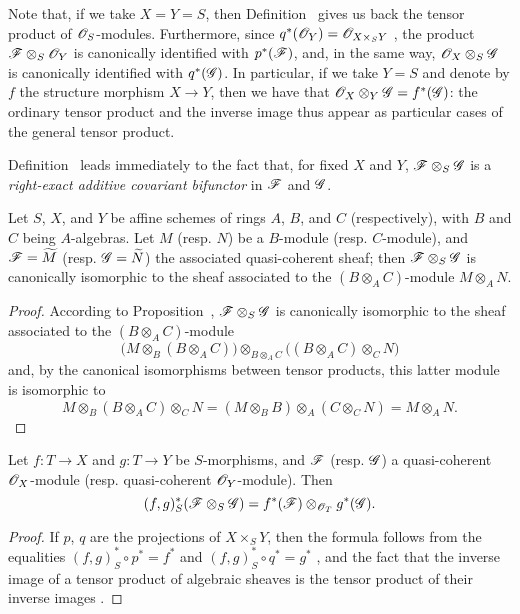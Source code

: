 Note that, if we take $X=Y=S$, then Definition~ gives us back the tensor
product of $\mathscr{O}_S$-modules. Furthermore, since $q^*(\mathscr{O}_Y)=\mathscr{O}_{X\times_S Y}$
, the product $\mathscr{F}\otimes_S\mathscr{O}_Y$ is canonically
identified with $p^*(\mathscr{F})$, and, in the same way,
$\mathscr{O}_X\otimes_S\mathscr{G}$ is canonically identified with $q^*(\mathscr{G})$. In
particular, if we take $Y=S$ and denote by $f$ the structure morphism $X\to Y$,
then we have that $\mathscr{O}_X\otimes_Y\mathscr{G}=f^*(\mathscr{G})$: the ordinary tensor
product and the inverse image thus appear as particular cases of the general
tensor product.

Definition~ leads immediately to the fact that, for fixed $X$ and
$Y$, $\mathscr{F}\otimes_S\mathscr{G}$ is a \emph{right-exact additive covariant bifunctor} in $\mathscr{F}$ and $\mathscr{G}$.

\begin{proposition}[9.1.3]
\label{1.9.1.3}
Let $S$, $X$, and $Y$ be affine schemes of rings
$A$, $B$, and $C$ (respectively), with $B$ and $C$ being $A$-algebras. Let $M$
(resp. $N$) be a $B$-module (resp. $C$-module), and
$\mathscr{F}={\widetilde{M}}$ (resp. $\mathscr{G}={\widetilde{N}}$) the
associated quasi-coherent sheaf; then $\mathscr{F}\otimes_S\mathscr{G}$ is
canonically isomorphic to the sheaf associated to the $(B\otimes_A C)$-module
$M\otimes_A N$.
\end{proposition}

\begin{proof}
\label{proof-1.9.1.3}
According to Proposition~, $\mathscr{F}\otimes_S\mathscr{G}$
is canonically isomorphic to the sheaf associated to the $(B\otimes_A C)$-module
\[
  \big(M\otimes_B(B\otimes_A C)\big)\otimes_{B\otimes_A C}\big((B\otimes_A C)\otimes_C N\big)
\]
and, by the canonical isomorphisms between tensor products, this latter module is isomorphic to
\[
  M\otimes_B(B\otimes_A C)\otimes_C N=(M\otimes_B B)\otimes_A(C\otimes_C N)=M\otimes_A N.
\]
\end{proof}

\begin{proposition}[9.1.4]
\label{1.9.1.4}
Let $f:T\to X$ and $g:T\to Y$ be $S$-morphisms, and $\mathscr{F}$ (resp. $\mathscr{G}$) a quasi-coherent $\mathscr{O}_X$-module (resp. quasi-coherent $\mathscr{O}_Y$-module).
Then
\[
  (f,g)^*_S(\mathscr{F}\otimes_S\mathscr{G})=f^*(\mathscr{F})\otimes_{\mathscr{O}_T}g^*(\mathscr{G}).
\]
\end{proposition}

\begin{proof}
\label{proof-1.9.14}
If $p$, $q$ are the projections of $X\times_S Y$, then the formula follows
from the equalities $(f,g)^*_S\circ p^*=f^*$ and
$(f,g)^*_S\circ q^*=g^*$ , and the fact that the inverse
image of a tensor product of algebraic sheaves is the tensor product of their inverse
images .
\end{proof}

